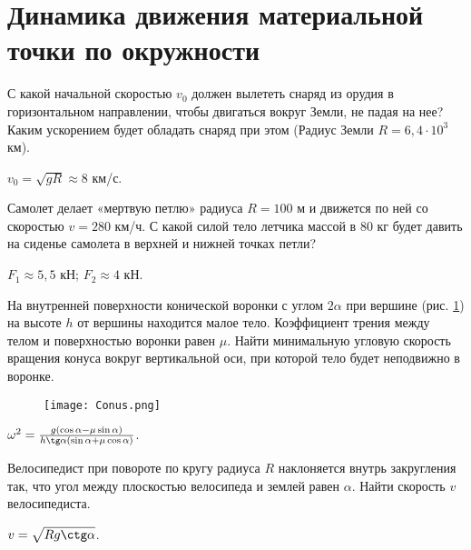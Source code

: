 \section{Динамика движения материальной точки по окружности}

\introProblems

\begin{ex} %
С какой начальной скоростью $v_0$ должен вылететь снаряд из орудия в горизонтальном направлении, чтобы двигаться вокруг Земли, не падая на нее? Каким ускорением будет обладать снаряд при этом (Радиус Земли $R = 6,4 \cdot 10^3$ км).
\begin{ans}
$v_0 = \sqrt{gR} \approx 8$ км/с.
\end{ans}
\end{ex}	

\begin{ex} %
Самолет делает «мертвую петлю» радиуса $R = 100$ м и движется по ней со скоростью $v = 280$ км/ч. С какой силой тело летчика массой в 80 кг будет давить на сиденье самолета в верхней и нижней точках петли?
\begin{ans}
$F_1 \approx 5,5$ кН; $F_2 \approx 4$ кН.
\end{ans}
\end{ex}	

\begin{ex}  %
На внутренней поверхности конической воронки с углом $2\alpha$ при вершине (рис. \ref{Conus}) на высоте $h$ от вершины находится малое тело. Коэффициент трения между телом и поверхностью воронки равен $\mu$. Найти минимальную угловую скорость вращения конуса вокруг вертикальной оси, при которой тело будет неподвижно в воронке.

\begin{figure}[h]
\centering
\texttt{[image: Conus.png]}
\caption{}
\label{Conus}
\end{figure}

\begin{ans}
$\omega^2 = \frac{g(\cos \alpha - \mu \sin \alpha)}{h \tg \alpha (\sin \alpha + \mu \cos \alpha)}$.
\end{ans}
\end{ex}	

\begin{ex} %
Велосипедист при повороте по кругу радиуса $R$ наклоняется внутрь закругления так, что угол между плоскостью велосипеда и землей равен $\alpha$. Найти скорость $v$ велосипедиста.
\begin{ans}
$v = \sqrt{Rg \ctg \alpha}$.
\end{ans}
\end{ex}	

